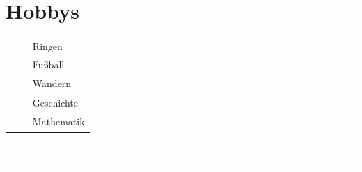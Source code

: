 \documentclass[onside]{article}
\begin{document}
{\begin{minipage}[t][\dimexpr\textheight-2\fboxrule-2\fboxsep\relax][t]{\dimexpr0.4\textwidth-2\fboxrule-2\fboxsep\relax}
        \section*{\large Hobbys}
        \begin{tabularx}{\textwidth}{cY}
            \includegraphics[width=1.25em]{wrestling1} & Ringen \\
            \includegraphics[width=1.25em]{football} & Fu\ss ball \\
            \includegraphics[width=1.25em]{hiking} & Wandern \\
            \includegraphics[width=1.25em]{history_scroll} & Geschichte \\
            \includegraphics[width=1.275em]{math2} & Mathematik \\
        \end{tabularx}
        \vspace{.3cm}
        \\
        \rule{\linewidth}{0.4pt}
    \end{minipage}%
}%
\end{document}
